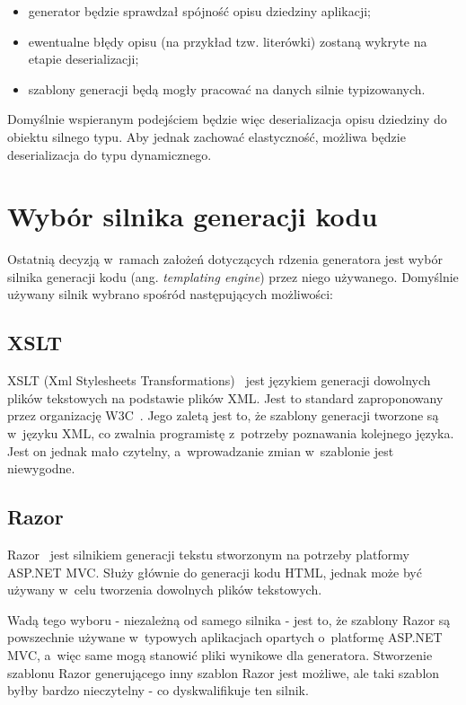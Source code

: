 \begin{itemize}
 \item generator będzie sprawdzał spójność opisu dziedziny aplikacji;
 \item ewentualne błędy opisu (na przykład tzw. literówki) zostaną wykryte na etapie deserializacji;
 \item szablony generacji będą mogły pracować na danych silnie typizowanych.
\end{itemize}

Domyślnie wspieranym podejściem będzie więc deserializacja opisu dziedziny do obiektu silnego typu.
Aby jednak zachować elastyczność, możliwa będzie deserializacja do typu dynamicznego.



\section{Wybór silnika generacji kodu} \label{sec:core:templating_engine}

Ostatnią decyzją w~ramach założeń dotyczących rdzenia generatora jest wybór silnika generacji kodu (ang. \emph{templating engine}) przez niego używanego.
Domyślnie używany silnik wybrano spośród następujących możliwości:


\subsection{XSLT}

XSLT (Xml Stylesheets Transformations)~\cite{xslt} jest językiem generacji dowolnych plików tekstowych na podstawie plików XML.
Jest to standard zaproponowany przez organizację W3C~\cite{w3c}.
Jego zaletą jest to, że szablony generacji tworzone są w~języku XML, co zwalnia programistę z~potrzeby poznawania kolejnego języka.
Jest on jednak mało czytelny, a~wprowadzanie zmian w~szablonie jest niewygodne.


\subsection{Razor}

Razor~\cite{razor} jest silnikiem generacji tekstu stworzonym na potrzeby platformy ASP.NET MVC.
Służy głównie do generacji kodu HTML, jednak może być używany w~celu tworzenia dowolnych plików tekstowych.

Wadą tego wyboru - niezależną od samego silnika - jest to, że szablony Razor są powszechnie używane w~typowych aplikacjach opartych o~platformę ASP.NET MVC, a~więc same mogą stanowić pliki wynikowe dla generatora.
Stworzenie szablonu Razor generującego inny szablon Razor jest możliwe, ale taki szablon byłby bardzo nieczytelny - co dyskwalifikuje ten silnik.


